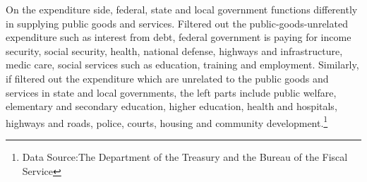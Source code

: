 On the expenditure side, federal, state and local government functions differently in supplying public goods and services. Filtered out the public-goods-unrelated expenditure such as interest from debt, federal government is paying for income security, social security, health, national defense, highways and infrastructure, medic care, social services such as education, training and employment. Similarly, if filtered out the expenditure which are unrelated to the public goods and services in state and local governments, the left parts include public welfare, elementary and secondary education, higher education, health and hospitals, highways and roads, police, courts, housing and community development.\footnote[2]{Data Source:The Department of the Treasury and the Bureau of the Fiscal Service }
\begin{figure}[H]
  \centering  %


\end{figure}
